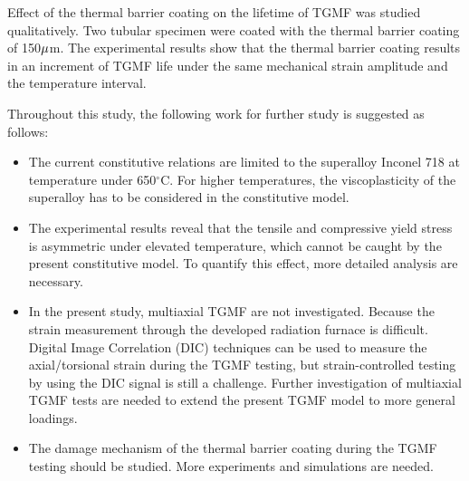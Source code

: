 Effect of the thermal barrier coating on the lifetime of TGMF was studied qualitatively. Two tubular specimen were coated with the thermal barrier coating of 150$\rm \mu$m. The experimental results show that the thermal barrier coating results in an increment of TGMF life under the same mechanical strain amplitude and the temperature interval. 

Throughout this study, the following work for further study is suggested as follows:
\begin{itemize}
\item The current constitutive relations are limited to the superalloy Inconel 718 at temperature under 650$^\circ$C. For higher temperatures, the viscoplasticity of the superalloy has to be considered in the constitutive model. 

\item The experimental results reveal that the tensile and compressive yield stress is asymmetric under elevated temperature, which cannot be caught by the present constitutive model. To quantify this effect, more detailed analysis are necessary.

\item In the present study, multiaxial TGMF are not investigated. Because the strain measurement through the developed radiation furnace is difficult. Digital Image Correlation (DIC) techniques can be used to measure the axial/torsional strain during the TGMF testing, but strain-controlled testing by using the DIC signal is still a challenge. Further investigation of multiaxial TGMF tests are needed to extend the present TGMF model to more general loadings.

\item The damage mechanism of the thermal barrier coating during the TGMF testing should be studied. More experiments and simulations are needed.
\end{itemize}


